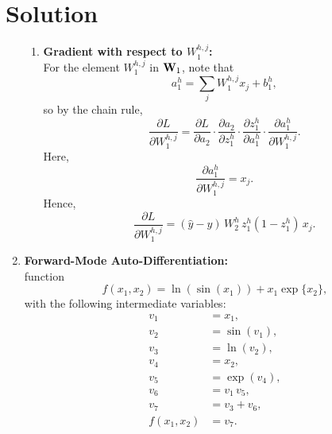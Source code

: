 \documentclass[submit]{../harvardml}
\newenvironment{answer}
  {\section*{Solution}}
{}
\begin{document}
\begin{answer}
\begin{enumerate}
\begin{enumerate}
            \item \textbf{Gradient with respect to $W_1^{h,j}$:}\\[1mm]
                  For the element $W_1^{h,j}$ in $\bold{W}_1$, note that
                  \[
                  a_1^h = \sum_{j}W_1^{h,j}x_j + b_1^h,
                  \]
                  so by the chain rule,
                  \[
                  \frac{\partial L}{\partial W_1^{h,j}} = \frac{\partial L}{\partial a_2}\cdot\frac{\partial a_2}{\partial z_1^h}\cdot\frac{\partial z_1^h}{\partial a_1^h}\cdot\frac{\partial a_1^h}{\partial W_1^{h,j}}.
                  \]
                  Here, 
                  \[
                  \frac{\partial a_1^h}{\partial W_1^{h,j}} = x_j.
                  \]
                  Hence,
                  \[
                  \frac{\partial L}{\partial W_1^{h,j}} = (\hat{y}-y)\,W_2^h\,z_1^h(1-z_1^h)\,x_j.
                  \]
          \end{enumerate}

    \item \textbf{Forward-Mode Auto-Differentiation:} \\
          function
          \[
          f(x_1,x_2) = \ln (\sin (x_1)) + x_1 \exp\{x_2\},
          \]
          with the following intermediate variables:
          \begin{align*}
            v_1         & = x_1,\\[1mm]
            v_2         & = \sin (v_1),\\[1mm]
            v_3         & = \ln (v_2),\\[1mm]
            v_4         & = x_2,\\[1mm]
            v_5         & = \exp (v_4),\\[1mm]
            v_6         & = v_1\,v_5,\\[1mm]
            v_7         & = v_3 + v_6,\\[1mm]
            f(x_1,x_2)  & = v_7.
          \end{align*}


\end{enumerate}
\end{answer}
\end{document}
